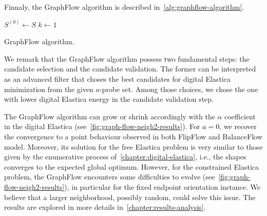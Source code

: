 Finnaly, the GraphFlow algorithm is described in~\cref{alg:graphflow-algorithm}.


\begin{algorithm}
 
 \BlankLine
 $S^{(0)} \longleftarrow S$\;
 $k \longleftarrow 1$\;
 \caption{GraphFlow algorithm.}
 \label{alg:graphflow-algorithm}  
\end{algorithm}

We remark that the GraphFlow algorithm possess two fundamental steps: the candidate selection and the candidate validation. The former can be interpreted as an advanced filter that choses the best candidates for digital Elastica minimization from the given $a$-probe set. Among those choices, we chose the one with lower digital Elastica energy in the candidate validation step.

The GraphFlow algorithm can grow or shrink accordingly with the $\alpha$ coefficient in the digital Elastica (see~\cref{fig:graph-flow-neigh2-results}). For $a=0$, we recover the convergence to a point behaviour observed in both FlipFlow and BalanceFlow model. Moreover, its solution for the free Elastica problem is very similar to those given by the enumerative process of~\cref{chapter:digital-elastica}, i.e., the shapes converges to the expected global optimum. However, for the constrained Elastica problem, the GraphFlow encounters some difficulties to evolve (see~\cref{fig:graph-flow-neigh2-results}), in particular for the fixed endpoint orientation instance. We believe that a larger neighborhood, possibly random, could solve this issue. The results are explored in more details in~\cref{chapter:results-analysis}.

